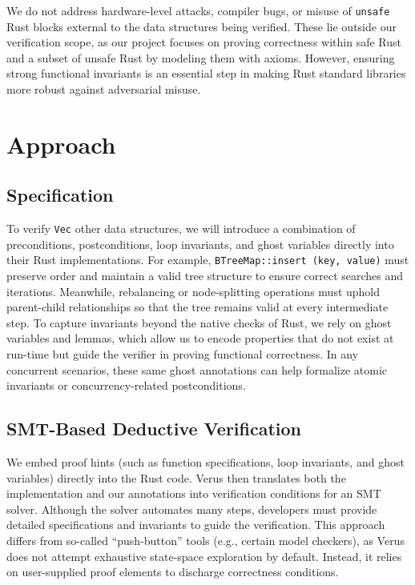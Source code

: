 \documentclass[conference]{IEEEtran}
\begin{document}
We do not address hardware-level attacks, compiler bugs, or misuse of \texttt{unsafe} Rust blocks external to the data structures being verified. These lie outside our verification scope, as our project focuses on proving correctness within safe Rust and a subset of unsafe Rust by modeling them with axioms. However, ensuring strong functional invariants is an essential step in making Rust standard libraries more robust against adversarial misuse.

\section{Approach}

\subsection{Specification}
To verify \texttt{Vec} other data structures, we will introduce a combination of preconditions, postconditions, loop invariants, and ghost variables directly into their Rust implementations. For example, \texttt{BTreeMap::insert (key, value)} must preserve order and maintain a valid tree structure to ensure correct searches and iterations. Meanwhile, rebalancing or node-splitting operations must uphold parent-child relationships so that the tree remains valid at every intermediate step. To capture invariants beyond the native checks of Rust, we rely on ghost variables and lemmas, which allow us to encode properties that do not exist at run-time but guide the verifier in proving functional correctness. In any concurrent scenarios, these same ghost annotations can help formalize atomic invariants or concurrency-related postconditions.

\subsection{SMT-Based Deductive Verification}

We embed proof hints (such as function specifications, loop invariants, and ghost variables) directly into the Rust code. Verus then translates both the implementation and our annotations into verification conditions for an SMT solver. Although the solver automates many steps, developers must provide detailed specifications and invariants to guide the verification. This approach differs from so-called “push-button” tools (e.g., certain model checkers), as Verus does not attempt exhaustive state-space exploration by default. Instead, it relies on user-supplied proof elements to discharge correctness conditions. 
\end{document}
